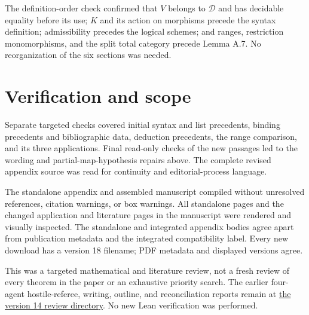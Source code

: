 \documentclass[10pt]{article}
\begin{document}
The definition-order check confirmed that $V$ belongs to $\mathcal D$ and has
decidable equality before its use; $K$ and its action on morphisms precede the
syntax definition; admissibility precedes the logical schemes; and ranges,
restriction monomorphisms, and the split total category precede Lemma A.7.
No reorganization of the six sections was needed.

\section*{Verification and scope}
Separate targeted checks covered initial syntax and list precedents, binding
precedents and bibliographic data, deduction precedents, the range comparison,
and its three applications. Final read-only checks of the new passages led to
the wording and partial-map-hypothesis repairs above. The complete revised
appendix source was read for continuity and editorial-process language.

The standalone appendix and assembled manuscript compiled without unresolved
references, citation warnings, or box warnings. All standalone pages and the
changed application and literature pages in the manuscript were rendered and
visually inspected. The standalone and integrated appendix bodies agree apart
from publication metadata and the integrated compatibility label. Every new
download has a version 18 filename; PDF metadata and displayed versions agree.

This was a targeted mathematical and literature review, not a fresh review of
every theorem in the paper or an exhaustive priority search. The earlier
four-agent hostile-referee, writing, outline, and reconciliation reports remain
at \href{https://github.com/flengyel/CategoricalEssentialIncompleteness/tree/main/Audit/2026-10-31-appendix-v14}{the version 14 review directory}.
No new Lean verification was performed.
\end{document}
